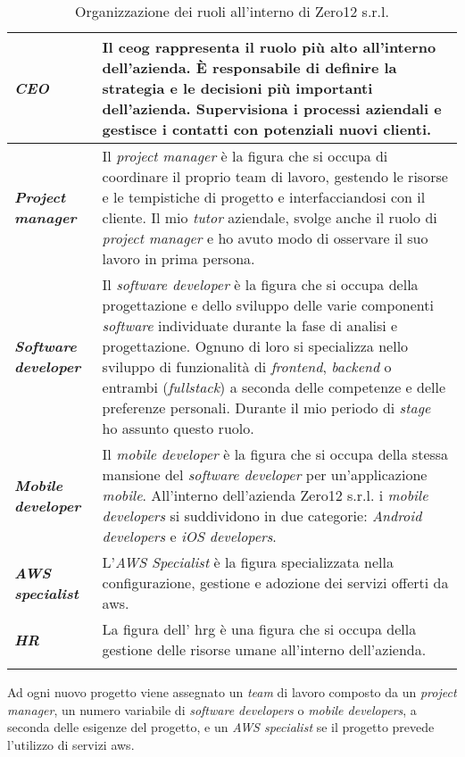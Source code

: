 \begin{longtable}{|>{\RaggedRight\arraybackslash}p{3.5cm}|>{\RaggedRight\arraybackslash}p{8.5cm}|}
    \rowcolor{tableoddrow}\textbf{\textit{CEO}} & Il \gls{ceog} rappresenta il ruolo più alto all'interno dell'azienda. È responsabile di definire la strategia e le decisioni più importanti dell'azienda. Supervisiona i processi aziendali e gestisce i contatti con potenziali nuovi clienti. \\
    \hline
    \rowcolor{tableevenrow}\textbf{\textit{Project manager}} & Il \textit{project manager} è la figura che si occupa di coordinare il proprio team di lavoro, gestendo le risorse e le tempistiche di progetto e interfacciandosi con il cliente. Il mio \textit{tutor} aziendale, svolge anche il ruolo di \textit{project manager} e ho avuto modo di osservare il suo lavoro in prima persona.\\
    \hline
    \rowcolor{tableoddrow}\textbf{\textit{Software developer}} & Il \textit{software developer} è la figura che si occupa della progettazione e dello sviluppo delle varie componenti \textit{software} individuate durante la fase di analisi e progettazione. Ognuno di loro si specializza nello sviluppo di funzionalità di \textit{frontend}, \textit{backend} o entrambi (\textit{fullstack}) a seconda delle competenze e delle preferenze personali.
    Durante il mio periodo di \textit{stage} ho assunto questo ruolo.\\
    \hline
    \rowcolor{tableevenrow}\textbf{\textit{Mobile developer}} & Il \textit{mobile developer} è la figura che si occupa della stessa mansione del \textit{software developer} per un'applicazione \textit{mobile}. All'interno dell'azienda Zero12 s.r.l. i \textit{mobile developers} si suddividono in due categorie: \textit{Android developers} e \textit{iOS developers}.\\
    \hline
    \rowcolor{tableoddrow}\textbf{\textit{AWS specialist}} & L'\textit{AWS Specialist} è la figura specializzata nella configurazione, gestione e adozione dei servizi offerti da \gls{aws}.\\
    \hline
    \rowcolor{tableevenrow}\textbf{\textit{HR}} & La figura dell' \gls{hrg} è una figura che si occupa della gestione delle risorse umane all'interno dell'azienda.\\
    \hline
    \caption{Organizzazione dei ruoli all'interno di Zero12 s.r.l.}
    \label{tab:ruoli}
\end{longtable}
Ad ogni nuovo progetto viene assegnato un \textit{team} di lavoro composto da un \textit{project manager}, un numero variabile di \textit{software developers} o \textit{mobile developers}, a seconda delle esigenze del progetto, e un \textit{AWS specialist} se il progetto prevede l'utilizzo di servizi \gls{aws}. 
\pagebreak
